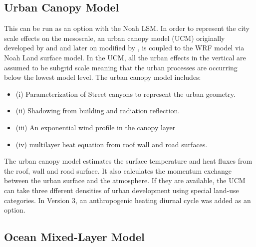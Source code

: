 \subsection{Urban Canopy Model}

This can be run as an option with the Noah LSM.
In order to represent the city scale effects on the mesoscale,
an urban canopy model (UCM) originally developed by \citet{kusaka01}
and \citet{kusaka04} and later on modified
by \citet{chen06}, is coupled to the WRF model via
Noah Land surface model. In the UCM, all the urban effects in the
vertical are assumed to be subgrid scale meaning that the urban
processes are occurring below the lowest model level. The urban
canopy model includes:
\begin{itemize}\setlength{\parskip}{-4pt}
\item (i) Parameterization of Street canyons to represent the urban
geometry.
\item (ii) Shadowing from building and radiation reflection.
\item (iii) An exponential wind profile in the canopy layer
\item (iv) multilayer heat equation from roof wall and road surfaces.
\end{itemize}

The urban canopy model estimates the surface temperature and heat
fluxes from the roof, wall and road surface. It also calculates
the momentum exchange between the urban surface and the atmosphere.
If they are available, the UCM can take three dfferent densities
of urban development using special land-use categories.
In Version 3, an anthropogenic heating diurnal cycle was added as
an option.

\subsection{Ocean Mixed-Layer Model}


